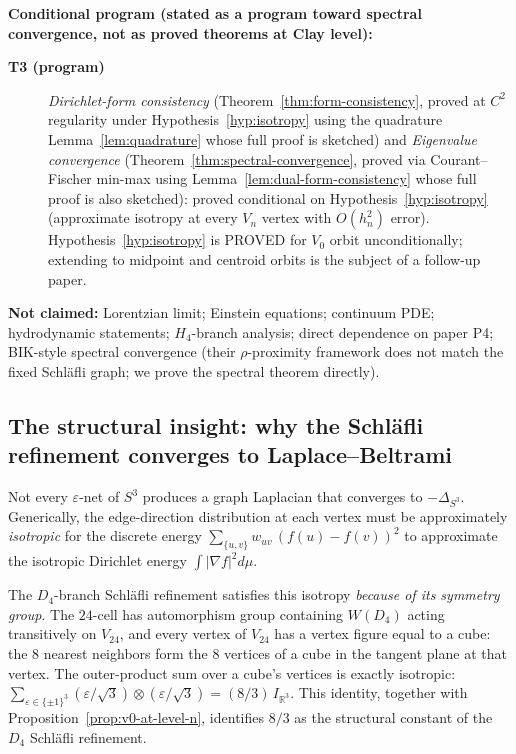 \documentclass[11pt, a4paper]{amsart}
\theoremstyle{definition}
\newcommand{\R}{\mathbb{R}}
\begin{document}
\textbf{Conditional program (stated as a program toward spectral
convergence, not as proved theorems at Clay level):}
\begin{description}
\item[\textbf{T3 (program)}] \emph{Dirichlet-form consistency}
  (Theorem~\ref{thm:form-consistency}, proved at $C^2$ regularity
  under Hypothesis~\ref{hyp:isotropy} using the
  quadrature Lemma~\ref{lem:quadrature} whose full proof is
  sketched) and \emph{Eigenvalue
  convergence} (Theorem~\ref{thm:spectral-convergence}, proved
  via Courant--Fischer min-max using
  Lemma~\ref{lem:dual-form-consistency} whose full proof is
  also sketched):
  proved conditional on Hypothesis~\ref{hyp:isotropy}
  (approximate isotropy at every $V_n$ vertex with $O(h_n^2)$
  error). Hypothesis~\ref{hyp:isotropy} is PROVED for $V_0$
  orbit unconditionally; extending to midpoint and centroid
  orbits is the subject of a follow-up paper.
\end{description}

\textbf{Not claimed:}
Lorentzian limit; Einstein equations; continuum PDE; hydrodynamic
statements; $H_4$-branch analysis; direct dependence on paper P4;
BIK-style spectral convergence (their $\rho$-proximity framework
does not match the fixed Schl\"{a}fli graph; we prove the
spectral theorem directly).

\subsection{The structural insight: why the Schl\"{a}fli
  refinement converges to Laplace--Beltrami}
\label{subsec:story}

Not every $\varepsilon$-net of $S^3$ produces a graph Laplacian
that converges to $-\Delta_{S^3}$. Generically, the edge-direction
distribution at each vertex must be approximately \emph{isotropic}
for the discrete energy $\sum_{\{u, v\}} w_{uv}\,(f(u) - f(v))^2$
to approximate the isotropic Dirichlet energy
$\int |\nabla f|^2 d\mu$.

The $D_4$-branch Schl\"{a}fli refinement satisfies this isotropy
\emph{because of its symmetry group}. The $24$-cell has
automorphism group containing $W(D_4)$ acting transitively on
$V_{24}$, and every vertex of $V_{24}$ has a vertex figure equal
to a cube: the $8$ nearest neighbors form the $8$ vertices of a
cube in the tangent plane at that vertex. The outer-product sum
over a cube's vertices is exactly isotropic:
$\sum_{\varepsilon \in \{\pm 1\}^3}
(\varepsilon/\sqrt{3}) \otimes (\varepsilon/\sqrt{3}) = (8/3)\,
I_{\R^3}$. This identity, together with
Proposition~\ref{prop:v0-at-level-n}, identifies $8/3$ as the
structural constant of the $D_4$ Schl\"{a}fli refinement.
\end{document}
